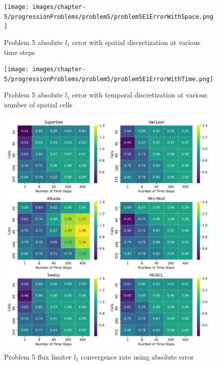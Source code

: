 \begin{figure}[p]
    \centering
    \texttt{[image: images/chapter-5/progressionProblems/problem5/problem5E1ErrorWithSpace.png]}
    \caption{Problem 5 absolute $l_{1}$ error with spatial discretization at various time steps}
    \label{fig:problem5_l1error_spatial_results}
\end{figure}

\clearpage

\begin{figure}[p]
    \centering
    \texttt{[image: images/chapter-5/progressionProblems/problem5/problem5E1ErrorWithTime.png]}
    \caption{Problem 5 absolute $l_{1}$ error with temporal discretization at various number of spatial cells}
    \label{fig:problem5_l1error_time_results}
\end{figure}

\clearpage

\begin{figure}[p]
    \centering
    \includegraphics[width=6in]{images/chapter-5/progressionProblems/problem5/problem5E1FluxLimiterConvergenceRate.png}
    \caption{Problem 5 flux limiter $l_{1}$ convergence rate using absolute error}
    \label{fig:problem5_l1error_fluxlimiter_convergence_rate}
\end{figure}

